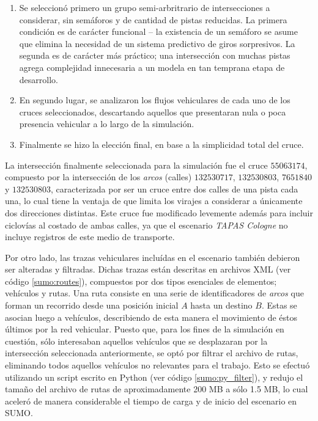 \documentclass[11pt,letterpaper]{article}
\begin{document}
\begin{enumerate}
	\item Se seleccionó primero un grupo semi-arbritrario de intersecciones a considerar, sin semáforos y de cantidad de pistas reducidas. La primera condición es de carácter funcional -- la existencia de un semáforo se asume que elimina la necesidad de un sistema predictivo de giros sorpresivos. La segunda es de carácter más práctico; una intersección con muchas pistas agrega complejidad innecesaria a un modela en tan temprana etapa de desarrollo.
	\item En segundo lugar, se analizaron los flujos vehiculares de cada uno de los cruces seleccionados, descartando aquellos que presentaran nula o poca presencia vehicular a lo largo de la simulación.
	\item Finalmente se hizo la elección final, en base a la simplicidad total del cruce.
\end{enumerate}

La intersección finalmente seleccionada para la simulación fue el cruce $55063174$, compuesto por la intersección de los \emph{arcos} (calles) $132530717$, $132530803$, $7651840$ y $132530803$, caracterizada por ser un cruce entre dos calles de una pista cada una, lo cual tiene la ventaja de que limita los virajes a considerar a únicamente dos direcciones distintas. Este cruce fue modificado levemente además para incluir ciclovías al costado de ambas calles, ya que el escenario \emph{TAPAS Cologne} no incluye registros de este medio de transporte.

Por otro lado, las trazas vehiculares incluídas en el escenario también debieron ser alteradas y filtradas. Dichas trazas están descritas en archivos XML (ver código \ref{sumo:routes}), compuestos por dos tipos esenciales de elementos; vehículos y rutas. Una ruta consiste en una serie de identificadores de \emph{arcos} que forman un recorrido desde una posición inicial $A$ hasta un destino $B$. Estas se asocian luego a vehículos, describiendo de esta manera el movimiento de éstos últimos por la red vehicular. Puesto que, para los fines de la simulación en cuestión, sólo interesaban aquellos vehículos que se desplazaran por la intersección seleccionada anteriormente, se optó por filtrar el archivo de rutas, eliminando todos aquellos vehículos no relevantes para el trabajo. Esto se efectuó utilizando un script escrito en Python (ver código \ref{sumo:py_filter}), y redujo el tamaño del archivo de rutas de aproximadamente 200 MB a sólo 1.5 MB, lo cual aceleró de manera considerable el tiempo de carga y de inicio del escenario en SUMO.
\end{document}
